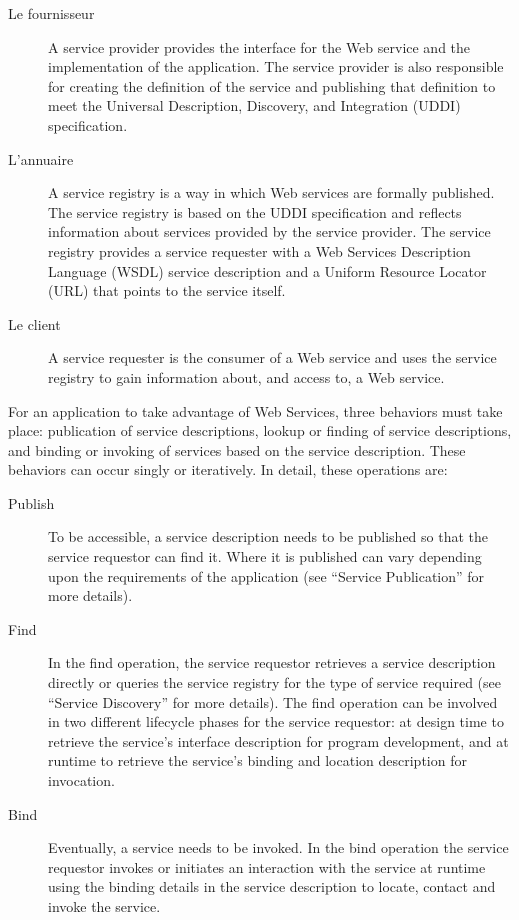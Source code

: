     \SpecialItem
    \begin{description} %
    \item[Le fournisseur] A service provider provides the interface for
      the Web service and the implementation of the application. The
      service provider is also responsible for creating the definition of
      the service and publishing that definition to meet the Universal
      Description, Discovery, and Integration (UDDI) specification.
  
    \item[L'annuaire] A service registry is a way in which Web services
      are formally published. The service registry is based on the UDDI
      specification and reflects information about services provided by
      the service provider. The service registry provides a service
      requester with a Web Services Description Language (WSDL) service
      description and a Uniform Resource Locator (URL) that points to the
      service itself.
  
    \item[Le client] A service requester is the consumer of a Web service
      and uses the service registry to gain information about, and access
      to, a Web service.
      
    \end{description}

    For an application to take advantage of Web Services, three behaviors
    must take place: publication of service descriptions, lookup or
    finding of service descriptions, and binding or invoking of services
    based on the service description. These behaviors can occur singly or
    iteratively. In detail, these operations are: \SpecialItem
    \begin{description}%
    \item[Publish] To be accessible, a service description needs to be
      published so that the service requestor can find it. Where it is
      published can vary depending upon the requirements of the
      application (see “Service Publication” for more details).
  
    \item[Find] In the find operation, the service requestor retrieves a
      service description directly or queries the service registry for the
      type of service required (see “Service Discovery” for more
      details). The find operation can be involved in two different
      lifecycle phases for the service requestor: at design time to
      retrieve the service’s interface description for program
      development, and at runtime to retrieve the service’s binding and
      location description for invocation.
      
    \item[Bind] Eventually, a service needs to be invoked. In the bind
      operation the service requestor invokes or initiates an interaction
      with the service at runtime using the binding details in the service
      description to locate, contact and invoke the service.
    \end{description}

